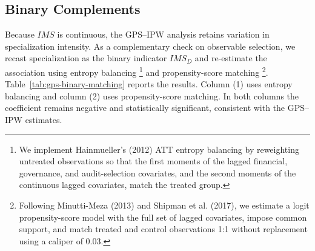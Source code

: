 \documentclass[11pt]{article}
\begin{document}
\subsection{Binary Complements}

Because \(IMS\) is continuous, the GPS--IPW analysis retains variation in specialization intensity. 
As a complementary check on observable selection, we recast specialization as the binary indicator \(IMS_D\) and re-estimate the association using entropy balancing \citep{hainmueller2012}
\footnote{We implement Hainmueller's (2012) ATT entropy balancing by reweighting untreated observations so that the first moments of the lagged financial, governance, and audit-selection covariates, and the second moments of the continuous lagged covariates, match the treated group.} and propensity-score matching \citep{minuttimeza2013,shipman2017psm}\footnote{Following Minutti-Meza (2013) and Shipman et al. (2017), we estimate a logit propensity-score model with the full set of lagged covariates, impose common support, and match treated and control observations 1:1 without replacement using a caliper of 0.03.}.
Table~\ref{tab:gps-binary-matching} reports the results. Column (1) uses entropy balancing and column (2) uses propensity-score matching. In both columns the coefficient remains negative and statistically significant, consistent with the GPS--IPW estimates.


\end{document}
